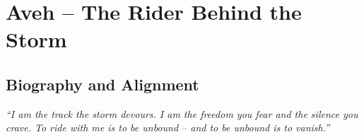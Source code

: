 \documentclass[10pt,a5paper]{book}
\begin{document}

%
% 
% 
% 
% 
% 
% 
% 

\section{Aveh – The Rider Behind the Storm}
\label{patron:aveh}

\subsection*{Biography and Alignment}

\textit{“I am the track the storm devours. I am the freedom you fear and the silence you crave. To ride with me is to be unbound – and to be unbound is to vanish.”}
\end{document}
